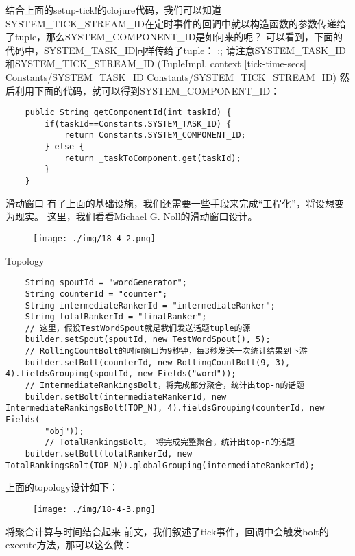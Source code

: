 结合上面的setup-tick!的clojure代码，我们可以知道SYSTEM\_TICK\_STREAM\_ID在定时事件的回调中就以构造函数的参数传递给了tuple，那么SYSTEM\_COMPONENT\_ID是如何来的呢？
可以看到，下面的代码中，SYSTEM\_TASK\_ID同样传给了tuple： ;;
请注意SYSTEM\_TASK\_ID和SYSTEM\_TICK\_STREAM\_ID (TupleImpl. context
{[}tick-time-secs{]} Constants/SYSTEM\_TASK\_ID
Constants/SYSTEM\_TICK\_STREAM\_ID)
然后利用下面的代码，就可以得到SYSTEM\_COMPONENT\_ID：

\begin{verbatim}
    public String getComponentId(int taskId) {
        if(taskId==Constants.SYSTEM_TASK_ID) {
            return Constants.SYSTEM_COMPONENT_ID;
        } else {
            return _taskToComponent.get(taskId);
        }
    }
\end{verbatim}

滑动窗口
有了上面的基础设施，我们还需要一些手段来完成``工程化''，将设想变为现实。
这里，我们看看Michael G. Noll的滑动窗口设计。

\begin{figure}
\centering
\texttt{[image: ./img/18-4-2.png]}
\caption{}
\end{figure}

Topology

\begin{verbatim}
    String spoutId = "wordGenerator";
    String counterId = "counter";
    String intermediateRankerId = "intermediateRanker";
    String totalRankerId = "finalRanker";
    // 这里，假设TestWordSpout就是我们发送话题tuple的源
    builder.setSpout(spoutId, new TestWordSpout(), 5);
    // RollingCountBolt的时间窗口为9秒钟，每3秒发送一次统计结果到下游
    builder.setBolt(counterId, new RollingCountBolt(9, 3), 4).fieldsGrouping(spoutId, new Fields("word"));
    // IntermediateRankingsBolt，将完成部分聚合，统计出top-n的话题
    builder.setBolt(intermediateRankerId, new IntermediateRankingsBolt(TOP_N), 4).fieldsGrouping(counterId, new Fields(
        "obj"));
        // TotalRankingsBolt， 将完成完整聚合，统计出top-n的话题
    builder.setBolt(totalRankerId, new TotalRankingsBolt(TOP_N)).globalGrouping(intermediateRankerId);
\end{verbatim}

上面的topology设计如下：

\begin{figure}
\centering
\texttt{[image: ./img/18-4-3.png]}
\caption{}
\end{figure}

将聚合计算与时间结合起来
前文，我们叙述了tick事件，回调中会触发bolt的execute方法，那可以这么做：

